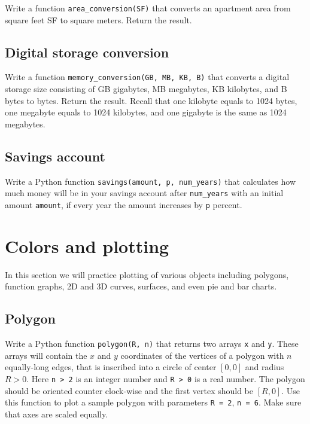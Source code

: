 Write a function {\tt area\_conversion(SF)} that converts an apartment 
area from square feet SF to square meters. Return the result. 


\subsection{Digital storage conversion}

Write a function {\tt memory\_conversion(GB, MB, KB, B)} that converts a digital storage 
size consisting of GB gigabytes, MB megabytes, KB kilobytes, and 
B bytes to bytes. Return the result. Recall that one kilobyte 
equals to 1024 bytes, one megabyte equals to 1024 kilobytes, and 
one gigabyte is the same as 1024 megabytes.


\subsection{Savings account}

Write a Python function {\tt savings(amount, p, num\_years)} that calculates
how much money will be in your savings account after {\tt num\_years} with 
an initial amount {\tt amount}, if every year the amount increases by {\tt p}
percent.


\section{Colors and plotting}

In this section we will practice plotting of various objects including polygons, 
function graphs, 2D and 3D curves, surfaces, and even pie and bar charts. 


\subsection{Polygon}

Write a Python function {\tt polygon(R, n)} that returns two arrays {\tt x} and {\tt y}.
These arrays will contain the $x$ and $y$ coordinates of the vertices of a polygon 
with $n$ equally-long edges, that is inscribed into a circle of 
center $[0, 0]$ and radius $R > 0$. Here {\tt n > 2} is an integer number 
and {\tt R > 0} is a real number. The polygon should be oriented counter clock-wise
and the first vertex should be $[R, 0]$.
Use this function to plot a sample
polygon with parameters {\tt R = 2}, {\tt n = 6}. Make sure that axes are scaled equally.

